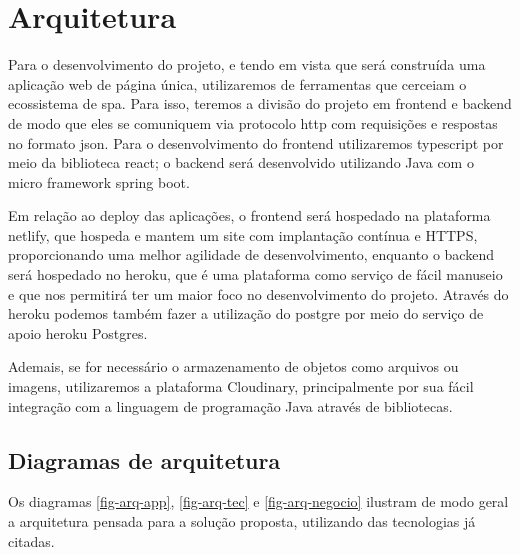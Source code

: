 \section{Arquitetura}
Para o desenvolvimento do projeto, e tendo em vista que será construída uma aplicação web de página única, utilizaremos de ferramentas que cerceiam o ecossistema de \ac{spa}. Para isso, teremos a divisão do projeto em \gls{frontend} e \gls{backend} de modo que eles se comuniquem via protocolo \ac{http} com requisições e respostas no formato \ac{json}. Para o desenvolvimento do \gls{frontend} utilizaremos \gls{typescript} por meio da biblioteca \gls{react}; o \gls{backend} será desenvolvido utilizando Java com o micro \gls{framework} \gls{spring boot}. %

Em relação ao \gls{deploy} das aplicações, o \gls{frontend} será hospedado na plataforma \gls{netlify}, que hospeda e mantem um site com implantação contínua e HTTPS, proporcionando uma melhor agilidade de desenvolvimento, enquanto o \gls{backend} será hospedado no \gls{heroku}, que é uma plataforma como serviço de fácil manuseio e que nos permitirá ter um maior foco no desenvolvimento do projeto. Através do \gls{heroku} podemos também fazer a utilização do \gls{postgre} por meio do serviço de apoio \gls{heroku} Postgres.

Ademais, se for necessário o armazenamento de objetos como arquivos ou imagens, utilizaremos a plataforma Cloudinary, principalmente por sua fácil integração com a linguagem de programação Java através de bibliotecas.

\subsection{Diagramas de arquitetura}
Os diagramas \autoref{fig-arq-app}, \autoref{fig-arq-tec} e \autoref{fig-arq-negocio} ilustram de modo geral a arquitetura pensada para a solução proposta, utilizando das tecnologias já citadas.


